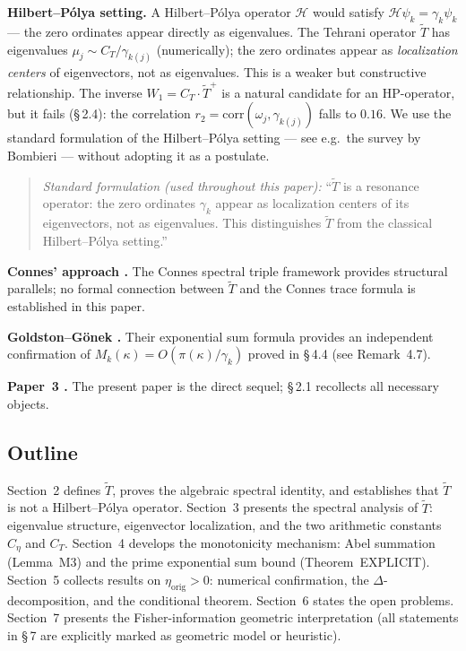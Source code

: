 \documentclass[11pt]{article}
\newcommand{\etaorig}{\eta_{\mathrm{orig}}}
\newcommand{\Tt}{\widetilde{T}}
\newcommand{\Ceta}{C_{\eta}}
\newcommand{\CT}{C_{T}}
\newcommand{\Wone}{W_1}
\begin{document}
\textbf{Hilbert--P\'olya setting.}
A Hilbert--P\'olya operator $\mathcal{H}$ would satisfy
$\mathcal{H}\psi_k = \gamma_k\psi_k$ ---
the zero ordinates appear directly as eigenvalues.
The Tehrani operator $\Tt$ has eigenvalues $\mu_j\sim\CT/\gamma_{k(j)}$
(numerically); the zero ordinates appear as \emph{localization centers}
of eigenvectors, not as eigenvalues.
This is a weaker but constructive relationship.
The inverse $\Wone = \CT\cdot\Tt^+$
is a natural candidate for an HP-operator,
but it fails (\S\,2.4): the correlation
$r_2 = \mathrm{corr}(\omega_j,\gamma_{k(j)})$ falls to $0.16$.
We use the standard formulation of the Hilbert--P\'olya setting
--- see e.g.\ the survey by Bombieri \cite{Bom00} ---
without adopting it as a postulate.

\begin{quote}
\textit{Standard formulation (used throughout this paper):}
``$\Tt$ is a resonance operator: the zero ordinates $\gamma_k$
appear as localization centers of its eigenvectors, not as eigenvalues.
This distinguishes $\Tt$ from the classical Hilbert--P\'olya setting.''
\end{quote}

\textbf{Connes' approach \cite{Con99}.}
The Connes spectral triple framework provides structural parallels;
no formal connection between $\Tt$ and the Connes trace formula is
established in this paper.

\textbf{Goldston--G\"onek \cite{GG05}.}
Their exponential sum formula provides an independent confirmation of
$M_k(\kappa) = O(\pi(\kappa)/\gamma_k)$ proved in \S\,4.4
(see Remark~4.7).

\textbf{Paper~3 \cite{Paper3}.}
The present paper is the direct sequel; \S\,2.1 recollects all necessary
objects.

\subsection{Outline}

Section~2 defines $\Tt$, proves the algebraic spectral identity,
and establishes that $\Tt$ is not a Hilbert--P\'olya operator.
Section~3 presents the spectral analysis of $\Tt$: eigenvalue structure,
eigenvector localization, and the two arithmetic constants
$\Ceta$ and $\CT$.
Section~4 develops the monotonicity mechanism: Abel summation (Lemma~M3)
and the prime exponential sum bound (Theorem~EXPLICIT).
Section~5 collects results on $\etaorig > 0$: numerical confirmation,
the $\Delta$-decomposition, and the conditional theorem.
Section~6 states the open problems.
Section~7 presents the Fisher-information geometric interpretation
(all statements in \S\,7 are explicitly marked as geometric model
or heuristic).
\end{document}
